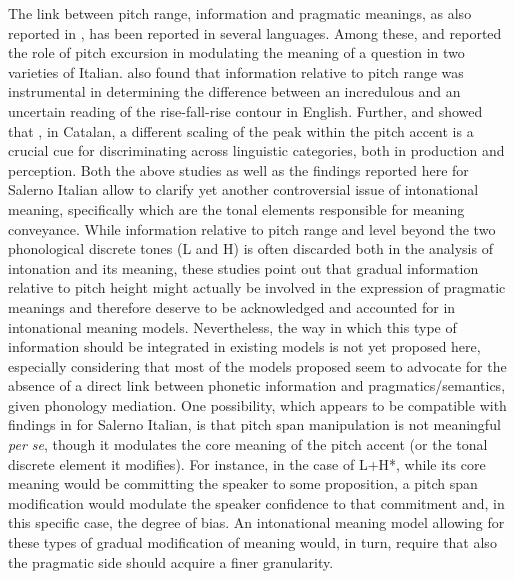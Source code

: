 \documentclass[output=paper,colorlinks,citecolor=brown]{langscibook}
\begin{document}
The link between pitch range, information and pragmatic meanings, as also reported in , has been reported in several languages. Among these, \citet{savino2011aa} and \citet{crocco2016aa} reported the role of pitch excursion in modulating the meaning of a question in two varieties of Italian. \citet{hirschberg92} also found that information relative to pitch range was instrumental in determining the difference between an incredulous and an uncertain reading of the rise-fall-rise contour in English. Further, \citet{vanrell2011aa} and \citet{borras-Comes2014aa} showed that , in Catalan, a different scaling of the peak within the pitch accent is a crucial cue for discriminating across linguistic categories, both in production and perception. Both the above studies as well as the findings reported here for Salerno Italian allow to clarify yet another controversial issue of intonational meaning, specifically which are the tonal elements responsible for meaning conveyance. While information relative to pitch range and level beyond the two phonological discrete tones (L and H) is often discarded both in the analysis of intonation and its meaning, these studies point out that gradual information relative to pitch height might actually be involved in the expression of pragmatic meanings and therefore deserve to be acknowledged and accounted for in intonational meaning models. Nevertheless, the way in which this type of information should be integrated in existing models is not yet proposed here, especially considering that most of the models proposed seem to advocate for the absence of a direct link between phonetic information and pragmatics/semantics, given phonology mediation. One possibility, which appears to be compatible with findings in \citet{Orrico+2020} for Salerno Italian, is that pitch span manipulation is not meaningful \textit{per se}, though it modulates the core meaning of the pitch accent (or the tonal discrete element it modifies). For instance, in the case of L+H*, while its core meaning would be committing the speaker to some proposition, a pitch span modification would modulate the speaker confidence to that commitment and, in this specific case, the degree of bias. An intonational meaning model allowing for these types of gradual modification of meaning would, in turn, require that also the pragmatic side should acquire a finer granularity.
\end{document}

